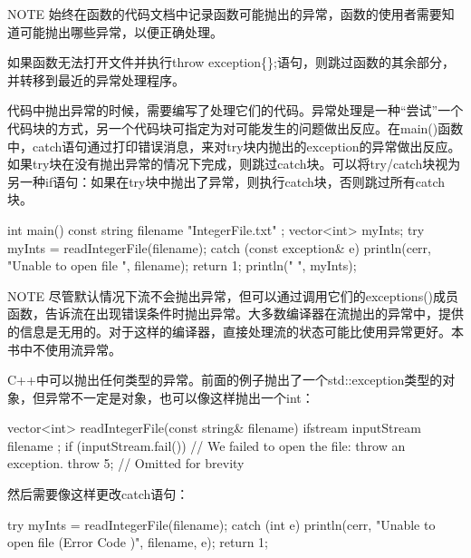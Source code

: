 \begin{myNotic}{NOTE}
始终在函数的代码文档中记录函数可能抛出的异常，函数的使用者需要知道可能抛出哪些异常，以便正确处理。
\end{myNotic}

如果函数无法打开文件并执行throw exception\{\};语句，则跳过函数的其余部分，并转移到最近的异常处理程序。

代码中抛出异常的时候，需要编写了处理它们的代码。异常处理是一种“尝试”一个代码块的方式，另一个代码块可指定为对可能发生的问题做出反应。在main()函数中，catch语句通过打印错误消息，来对try块内抛出的exception的异常做出反应。如果try块在没有抛出异常的情况下完成，则跳过catch块。可以将try/catch块视为另一种if语句：如果在try块中抛出了异常，则执行catch块，否则跳过所有catch块。

\begin{cpp}
int main()
{
    const string filename { "IntegerFile.txt" };
    vector<int> myInts;
    try {
        myInts = readIntegerFile(filename);
    } catch (const exception& e) {
        println(cerr, "Unable to open file {}", filename);
        return 1;
    }
    println("{} ", myInts);
}
\end{cpp}

\begin{myNotic}{NOTE}
尽管默认情况下流不会抛出异常，但可以通过调用它们的exceptions()成员函数，告诉流在出现错误条件时抛出异常。大多数编译器在流抛出的异常中，提供的信息是无用的。对于这样的编译器，直接处理流的状态可能比使用异常更好。本书中不使用流异常。
\end{myNotic}


C++中可以抛出任何类型的异常。前面的例子抛出了一个std::exception类型的对象，但异常不一定是对象，也可以像这样抛出一个int：

\begin{cpp}
vector<int> readIntegerFile(const string& filename)
{
    ifstream inputStream { filename };
    if (inputStream.fail()) {
        // We failed to open the file: throw an exception.
        throw 5;
    }
    // Omitted for brevity
}
\end{cpp}

然后需要像这样更改catch语句：

\begin{cpp}
try {
    myInts = readIntegerFile(filename);
} catch (int e) {
    println(cerr, "Unable to open file {} (Error Code {})", filename, e);
    return 1;
}
\end{cpp}

